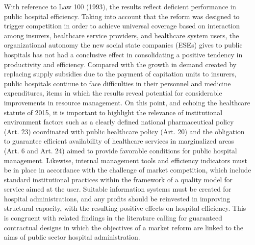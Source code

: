 \documentclass[11pt,a4paper,oneside]{article}
\begin{document}
With reference to Law 100 (1993), the results reflect deficient performance in public hospital efficiency. Taking into account that the reform was designed to trigger competition in order to achieve universal coverage based on interaction among insurers, healthcare service providers, and healthcare system users, the organizational autonomy the new social state companies (ESEs) gives to public hospitals has not had a conclusive effect in consolidating a positive tendency in productivity and efficiency. Compared with the growth in demand created by replacing supply subsidies due to the payment of capitation units to insurers, public hospitals continue to face difficulties in their personnel and medicine expenditures, items in which the results reveal potential for considerable improvements in resource management. On this point, and echoing the healthcare statute of 2015, it is important to highlight the relevance of institutional environment factors such as a clearly defined national pharmaceutical policy (Art. 23) coordinated with public healthcare policy (Art. 20) and the obligation to guarantee efficient availability of healthcare services in marginalized areas (Art. 6 and Art. 24) aimed to provide favorable conditions for public hospital management. Likewise, internal management tools and efficiency indicators must be in place in accordance with the challenge of market competition, which include standard institutional practices within the framework of a quality model for service aimed at the user. Suitable information systems must be created for hospital administrations, and any profits should be reinvested in improving structural capacity, with the resulting positive effects on hospital efficiency. This is congruent with related findings in the literature calling for guaranteed contractual designs in which the objectives of a market reform are linked to the aims of public sector hospital administration.




\end{document}
